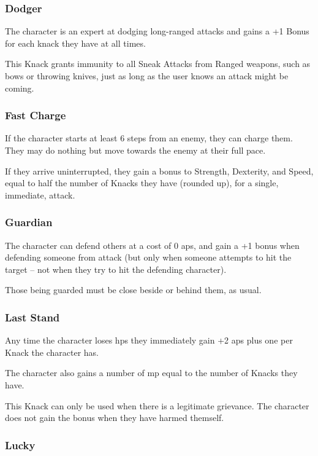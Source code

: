 \begin{multicols}{2}
\subsubsection{Dodger}
\label{dodger}

The character is an expert at dodging long-ranged attacks and gains a +1 Bonus for each knack they have at all times.

This Knack grants immunity to all Sneak Attacks from Ranged weapons, such as bows or throwing knives, just as long as the user knows an attack might be coming.

\subsubsection{Fast Charge}

If the character starts at least 6 steps from an enemy, they can charge them.
They may do nothing but move towards the enemy at their full pace.

If they arrive uninterrupted, they gain a bonus to Strength, Dexterity, and Speed, equal to half the number of Knacks they have (rounded up), for a single, immediate, attack.

\subsubsection{Guardian}

The character can defend others at a cost of 0 \glspl{ap}, and gain a +1 bonus when defending someone from attack (but only when someone attempts to hit the target -- not when they try to hit the defending character).

Those being guarded must be close beside or behind them, as usual.

\subsubsection{Last Stand}

Any time the character loses \glspl{hp} they immediately gain +2 \glspl{ap} plus one per Knack the character has.

The character also gains a number of \gls{mp} equal to the number of Knacks they have.

This Knack can only be used when there is a legitimate grievance.
The character does not gain the bonus when they have harmed themself.

\subsubsection{Lucky}


\end{multicols}

